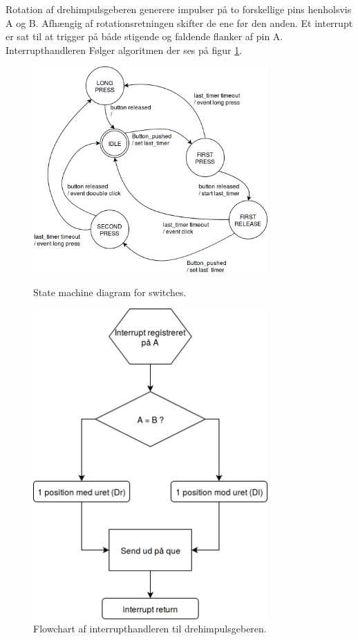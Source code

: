 Rotation af drehimpulsgeberen generere impulser på to forskellige pins henholsvis A og B.
Afhængig af rotationsretningen skifter de ene før den anden. 
Et interrupt er sat til at trigger på både stigende og faldende flanker af pin A.
Interrupthandleren Følger algoritmen der ses på figur \ref{fig:digiFlow}.\newline
\begin{figure}[!ht]
	\centering
	\begin{minipage}[b]{0.50\textwidth}
		\centering 
		\includegraphics[width=0.8\textwidth]{billeder/buttons_statemachine.png}
		\newline 
		\caption{State machine diagram for switches. } 
		\label{fig:SW_statemachine}
	\end{minipage}\hfill
	\begin{minipage}[b]{0.50\textwidth}
		\centering 
		\includegraphics[width=0.8\textwidth]{billeder/digi_interrupt_flow.png} 
		\caption{Flowchart af interrupthandleren til drehimpulsgeberen. } 
		\label{fig:digiFlow} 
	\end{minipage}
\end{figure}
\pagebreak



